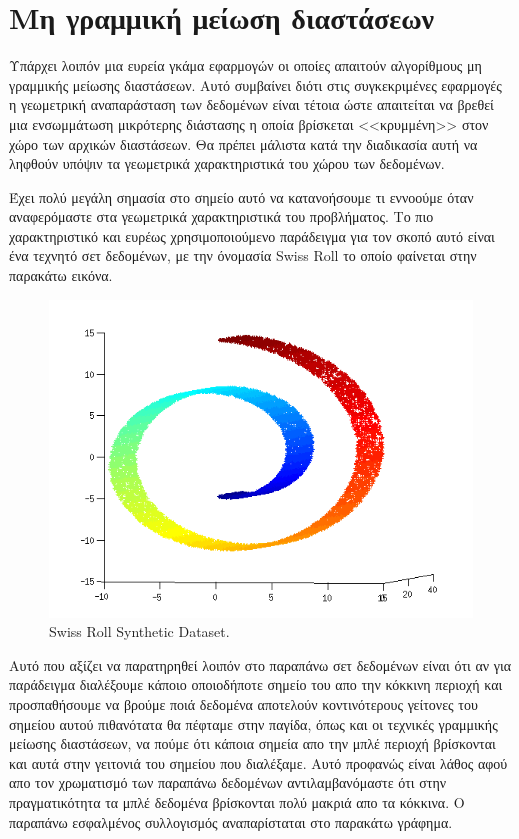 \section{Μη γραμμική μείωση διαστάσεων}
\par
Υπάρχει λοιπόν μια ευρεία γκάμα εφαρμογών οι οποίες απαιτούν αλγορίθμους μη γραμμικής μείωσης διαστάσεων. Αυτό συμβαίνει διότι στις συγκεκριμένες εφαρμογές η γεωμετρική αναπαράσταση των δεδομένων είναι τέτοια ώστε απαιτείται να βρεθεί μια ενσωμμάτωση μικρότερης διάστασης η οποία βρίσκεται <<κρυμμένη>> στον χώρο των αρχικών διαστάσεων. Θα πρέπει μάλιστα κατά την διαδικασία αυτή να ληφθούν υπόψιν τα γεωμετρικά χαρακτηριστικά του χώρου των δεδομένων. 
\par
Έχει πολύ μεγάλη σημασία στο σημείο αυτό να κατανοήσουμε τι εννοούμε όταν αναφερόμαστε στα γεωμετρικά χαρακτηριστικά του προβλήματος. Το πιο χαρακτηριστικό και ευρέως χρησιμοποιούμενο παράδειγμα για τον σκοπό αυτό είναι ένα τεχνητό σετ δεδομένων, με την όνομασία \textlatin{Swiss Roll} το οποίο φαίνεται στην παρακάτω εικόνα. \\
\vspace{1.0cm}
\begin{figure}[h]
\centering
\includegraphics[scale=0.8]{figs/2.png}
\newline
\caption{ \textlatin{Swiss Roll Synthetic Dataset}.} 
\end{figure}
\vspace{1.0cm}
\par
Αυτό που αξίζει να παρατηρηθεί λοιπόν στο παραπάνω σετ δεδομένων είναι ότι αν για παράδειγμα διαλέξουμε κάποιο οποιοδήποτε σημείο του απο την κόκκινη περιοχή και προσπαθήσουμε να βρούμε ποιά δεδομένα αποτελούν κοντινότερους γείτονες του σημείου αυτού πιθανότατα θα πέφταμε στην παγίδα, όπως και οι τεχνικές γραμμικής μείωσης διαστάσεων, να πούμε ότι κάποια σημεία απο την μπλέ περιοχή βρίσκονται και αυτά στην γειτονιά του σημείου που διαλέξαμε. Αυτό προφανώς είναι λάθος αφού απο τον χρωματισμό των παραπάνω δεδομένων αντιλαμβανόμαστε ότι στην πραγματικότητα τα μπλέ δεδομένα βρίσκονται πολύ μακριά απο τα κόκκινα. Ο παραπάνω εσφαλμένος συλλογισμός αναπαρίσταται στο παρακάτω γράφημα.
